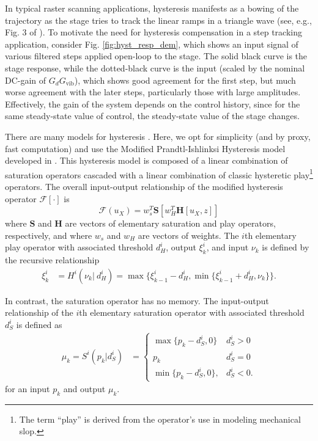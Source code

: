 \documentclass[twocolumn,twoside]{IEEEtran}
\newcommand{\Gv}{\ensuremath{G_{\text{vib}}}\xspace}
\begin{document}
In typical raster scanning applications, hysteresis manifests as a bowing of the trajectory as the stage tries to track the linear ramps in a triangle wave (see, e.g., Fig. 3 of \cite{Leang_IEEECS_2009}). To motivate the need for hysteresis compensation in a step tracking application, consider Fig. \ref{fig:hyst_resp_dem}, which shows an input signal of various filtered steps applied open-loop to the stage. The solid black curve is the stage response, while the dotted-black curve is the input (scaled by the nominal DC-gain of $G_d\Gv$), which shows good agreement for the first step, but much worse agreement with the later steps, particularly those with large amplitudes. Effectively, the gain of the system depends on the control history, since for the same steady-state value of control, the steady-state value of the stage changes.

There are many models for hysteresis \cite{croft_creep_1999, rakotondrabe_bouc_2011, Lui_hysteresis_2013}. Here, we opt for simplicity (and by proxy, fast computation) and use the Modified Prandtl-Ishlinksi Hysteresis model developed in \cite{kuhnen_modeling_2003}. This hysteresis model is composed of a linear combination of saturation operators cascaded with a linear combination of classic hysteretic play\footnote{The term ``play'' is derived from the operator's use in modeling mechanical slop.} operators. The overall input-output relationship of the modified hysteresis operator $\mathcal{F}[\cdot]$ is
\begin{equation}
  \mathcal{F}(u_X) = w_s^T\mathbf{S}\left[w_H^T \mathbf{H}[u_X, z]\right]\nonumber
\end{equation}
where $\mathbf{S}$ and $\mathbf{H}$ are vectors of elementary saturation and play operators, respectively, and
where $w_s$ and $w_H$ are vectors of weights. The $i$th elementary play operator with associated threshold $d_H^i$, output $\xi_k^i$, and input $\nu_k$ is defined by the recursive relationship
\begin{align}
  \xi^i_k &=
  H^i(\nu_k|\: d_H^i) =
  \max\{\xi^i_{k-1}-d_H^i, \min\{\xi^i_{k-1} + d_H^i, \nu_k\} \}.\nonumber
\end{align}

In contrast, the saturation operator has no memory. The input-output relationship of the $i$th elementary saturation operator with associated threshold $d_S^i$ is defined as
\begin{align}
  \mu_k=
  S^i(p_k| d_S^i) &=
  \begin{cases}
    \max\{p_k - d_S^i, 0\} & d_S^i >0\nonumber\\
    p_k & d_S^i = 0\nonumber\\
    \min\{p_k-d_S^i, 0\},  & d_S^i<0.\nonumber
  \end{cases}
\end{align}
for an input $p_k$ and output $\mu_k$. 
\end{document}
